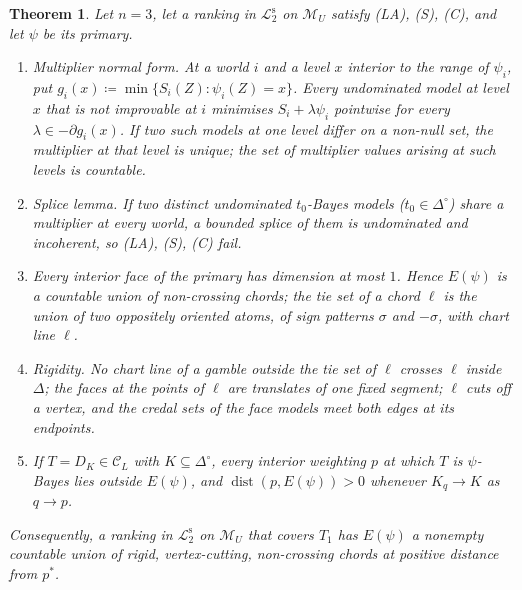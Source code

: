 \documentclass[11pt]{article}
\newtheorem{theorem}{Theorem}[section]
\theoremstyle{definition}
\theoremstyle{remark}
\newcommand{\Di}{\Delta^{\circ}}
\newcommand{\M}{\mathcal M}
\newcommand{\C}{\mathcal C}
\newcommand{\Ltwo}{\mathcal L_2^{\mathrm s}}
\begin{document}
\begin{theorem}\label{thm:Ltwo}
Let $n=3$, let a ranking in $\Ltwo$ on $\M_U$ satisfy (LA), (S), (C), and let $\psi$ be its primary.
\begin{enumerate}[leftmargin=*,label=(\alph*)]
\item \emph{Multiplier normal form.} At a world $i$ and a level $x$ interior to the range of $\psi_i$, put $g_i(x)\coloneqq\min\{S_i(Z):\psi_i(Z)=x\}$. Every undominated model at level $x$ that is not improvable at $i$ minimises $S_i+\lambda\psi_i$ pointwise for every $\lambda\in-\partial g_i(x)$. If two such models at one level differ on a non-null set, the multiplier at that level is unique; the set of multiplier \emph{values} arising at such levels is countable.
\item \emph{Splice lemma.} If two distinct undominated $t_0$-Bayes models ($t_0\in\Di$) share a multiplier at every world, a bounded splice of them is undominated and incoherent, so (LA), (S), (C) fail.
\item Every interior face of the primary has dimension at most $1$. Hence $E(\psi)$ is a countable union of non-crossing chords; the tie set of a chord $\ell$ is the union of two oppositely oriented atoms, of sign patterns $\sigma$ and $-\sigma$, with chart line $\ell$.
\item \emph{Rigidity.} No chart line of a gamble outside the tie set of $\ell$ crosses $\ell$ inside $\Delta$; the faces at the points of $\ell$ are translates of one fixed segment; $\ell$ cuts off a vertex, and the credal sets of the face models meet both edges at its endpoints.
\item If $T=D_K\in\C_L$ with $K\subseteq\Di$, every interior weighting $p$ at which $T$ is $\psi$-Bayes lies outside $E(\psi)$, and $\operatorname{dist}(p,E(\psi))>0$ whenever $K_q\to K$ as $q\to p$.
\end{enumerate}
Consequently, a ranking in $\Ltwo$ on $\M_U$ that covers $T_1$ has $E(\psi)$ a nonempty countable union of rigid, vertex-cutting, non-crossing chords at positive distance from $p^*$.
\end{theorem}
\end{document}
